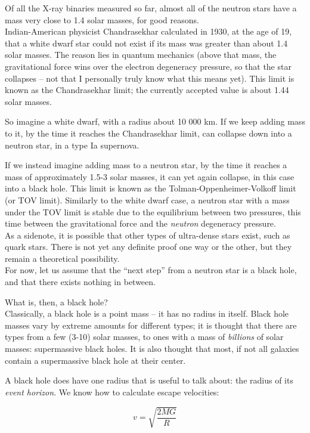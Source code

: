 Of all the X-ray binaries measured so far, almost all of the neutron stars have a mass very close to 1.4 solar masses, for good reasons.\\
Indian-American physicist Chandrasekhar calculated in 1930, at the age of 19, that a white dwarf star could not exist if its mass was greater than about 1.4 solar masses. The reason lies in quantum mechanics (above that mass, the gravitational force wins over the electron degeneracy pressure, so that the star collapses -- not that I personally truly know what this means yet). This limit is known as the Chandrasekhar limit; the currently accepted value is about 1.44 solar masses.

So imagine a white dwarf, with a radius about 10 000 km. If we keep adding mass to it, by the time it reaches the Chandrasekhar limit, can collapse down into a neutron star, in a type Ia supernova.

If we instead imagine adding mass to a neutron star, by the time it reaches a mass of approximately 1.5-3 solar masses, it can yet again collapse, in this case into a black hole. This limit is known as the Tolman-Oppenheimer-Volkoff limit (or TOV limit). Similarly to the white dwarf case, a neutron star with a mass under the TOV limit is stable due to the equilibrium between two pressures, this time between the gravitational force and the \emph{neutron} degeneracy pressure.\\
As a sidenote, it is possible that other types of ultra-dense stars exist, such as quark stars. There is not yet any definite proof one way or the other, but they remain a theoretical possibility.\\
For now, let us assume that the ``next step'' from a neutron star is a black hole, and that there exists nothing in between.

What is, then, a black hole?\\
Classically, a black hole is a point mass -- it has no radius in itself. Black hole masses vary by extreme amounts for different types; it is thought that there are types from a few (3-10) solar masses, to ones with a mass of \emph{billions} of solar masses: supermassive black holes. It is also thought that most, if not all galaxies contain a supermassive black hole at their center.

A black hole does have one radius that is useful to talk about: the radius of its \emph{event horizon}. We know how to calculate escape velocities:

\begin{equation}
v = \sqrt{\frac{2 M G}{R}}
\end{equation}

